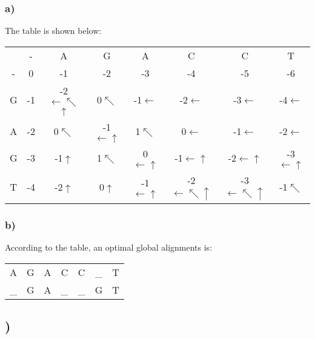 \documentclass{article}
\begin{document}
\subsubsection{a)}
The table is shown below:\\
\begin{center}
\begin{tabular}{c|c|c|c|c|c|c|c|}
\multicolumn{1}{c}{ } & \multicolumn{1}{c}{-} & \multicolumn{1}{c}{A} & \multicolumn{1}{c}{G} & \multicolumn{1}{c}{A} & \multicolumn{1}{c}{C} & \multicolumn{1}{c}{C} & \multicolumn{1}{c}{T} \\
\cline{2-8}
- & 0 & \cellcolor{red!50}-1 & -2 & -3 & -4 & -5 & -6 \\
\cline{2-8}
G & \cellcolor{red!50}-1 & -2$\leftarrow\nwarrow$$\uparrow$ & \cellcolor{red!50}0$\nwarrow$ & -1$\leftarrow$ & -2$\leftarrow$ & -3$\leftarrow$ & -4$\leftarrow$ \\
\cline{2-2}
A & -2 & \cellcolor{red!50}0$\nwarrow$ & -1$\leftarrow\uparrow$ & \cellcolor{red!50}1$\nwarrow$ & \cellcolor{red!50}0$\leftarrow$ & \cellcolor{red!50}-1$\leftarrow$ & -2$\leftarrow$ \\
\cline{2-2}
G & -3 & -1$\uparrow$ & \cellcolor{red!50}1$\nwarrow$ & \cellcolor{red!50}0$\leftarrow\uparrow$ & \cellcolor{red!50}-1$\leftarrow\uparrow$ & \cellcolor{red!50}-2$\leftarrow\uparrow$ & -3$\leftarrow\uparrow$ \\
\cline{2-2}
T & -4 & -2$\uparrow$ & 0$\uparrow$ & -1$\leftarrow\uparrow$ & -2$\leftarrow\nwarrow\uparrow$ & -3$\leftarrow\nwarrow\uparrow$ & \cellcolor{red!50}-1$\nwarrow$ \\
\cline{2-8}
\end{tabular}
\end{center}
\subsubsection{b)}
According to the table, an optimal global alignments is:\\
\begin{center}
\begin{tabular}{ccccccc}
	 A &  G &  A &  C &  C & \_ & T \\
	\_ &  G &  A & \_ & \_ &  G & T
\end{tabular}
\end{center}

\subsection{)}
\end{document}
